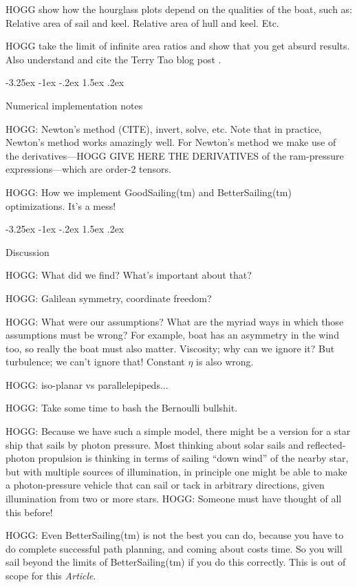\documentclass[letterpaper]{article}
\makeatletter
\newcommand{\documentname}{\textsl{Article}}
\renewcommand\section{\@startsection {section}{1}{\z@}%
  {-3.25ex \@plus -1ex \@minus -.2ex}%
  {1.5ex \@plus .2ex}%
  {\raggedright\normalfont\large\bfseries}}
\makeatother
\begin{document}
HOGG show how the hourglass plots depend on the qualities of the boat, such as: Relative area of sail and keel. Relative area of hull and keel. Etc.

HOGG take the limit of infinite area ratios and show that you get absurd results. Also understand and cite the Terry Tao blog post \cite{tao}.

\section{Numerical implementation notes}\label{sec:implementation}

HOGG: Newton's method (CITE), invert, solve, etc.
Note that in practice, Newton's method works amazingly well.
For Newton's method we make use of the derivatives---HOGG GIVE HERE THE DERIVATIVES of the ram-pressure expressions---which are order-2 tensors.

HOGG: How we implement GoodSailing(tm) and BetterSailing(tm) optimizations. It's a mess!

\section{Discussion}\label{sec:discussion}

HOGG: What did we find? What's important about that?

HOGG: Galilean symmetry, coordinate freedom?

HOGG: What were our assumptions? What are the myriad ways in which those assumptions must be wrong? For example, boat has an asymmetry in the wind too, so really the boat must also matter. Viscosity; why can we ignore it? But turbulence; we can't ignore that! Constant $\eta$ is also wrong.

HOGG: iso-planar vs parallelepipeds...

HOGG: Take some time to bash the Bernoulli bullshit.

HOGG: Because we have such a simple model, there might be a version for a star ship that sails by photon pressure.
Most thinking about solar sails and reflected-photon propulsion is thinking in terms of sailing ``down wind'' of the nearby star, but with multiple sources of illumination, in principle one might be able to make a photon-pressure vehicle that can sail or tack in arbitrary directions, given illumination from two or more stars.
HOGG: Someone must have thought of all this before!

HOGG: Even BetterSailing(tm) is not the best you can do, because you have to do complete successful path planning, and coming about costs time. So you will sail beyond the limits of BetterSailing(tm) if you do this correctly. This is out of scope for this \documentname.
\end{document}
